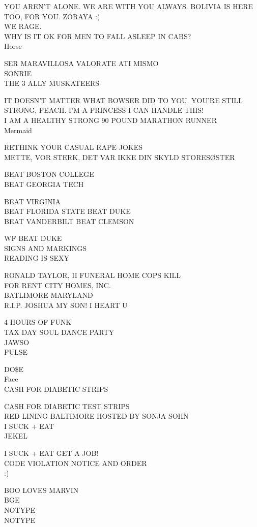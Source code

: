 \documentclass[10pt,letterpaper]{article}
\begin{document}
YOU AREN'T ALONE.  WE ARE WITH YOU ALWAYS.  BOLIVIA IS HERE TOO, FOR YOU.  ZORAYA :)\\
WE RAGE.\\
WHY IS IT OK FOR MEN TO FALL ASLEEP IN CABS?\\
Horse

SER MARAVILLOSA VALORATE ATI MISMO\\
SONRIE\\
THE 3 ALLY MUSKATEERS

IT DOESN'T MATTER WHAT BOWSER DID TO YOU.  YOU'RE STILL STRONG, PEACH.  I'M A PRINCESS I CAN HANDLE THIS!\\
I AM A HEALTHY STRONG 90 POUND MARATHON RUNNER\\
Mermaid

RETHINK YOUR CASUAL RAPE JOKES\\
METTE, VOR STERK, DET VAR IKKE DIN SKYLD STORESØSTER

BEAT BOSTON COLLEGE\\
BEAT GEORGIA TECH

BEAT VIRGINIA\\
BEAT FLORIDA STATE BEAT DUKE\\
BEAT VANDERBILT BEAT CLEMSON

WF BEAT DUKE\\
SIGNS AND MARKINGS\\
READING IS SEXY

RONALD TAYLOR, II FUNERAL HOME COPS KILL\\
FOR RENT CITY HOMES, INC.\\
BATLIMORE MARYLAND\\
R.I.P. JOSHUA MY SON! I HEART U

4 HOURS OF FUNK\\
TAX DAY SOUL DANCE PARTY\\
JAWSO\\
PULSE

DO\$E\\
Face\\
CASH FOR DIABETIC STRIPS

CASH FOR DIABETIC TEST STRIPS\\
RED LINING BALTIMORE HOSTED BY SONJA SOHN\\
I SUCK + EAT\\
JEKEL

I SUCK + EAT GET A JOB!\\
CODE VIOLATION NOTICE AND ORDER\\
:)

BOO LOVES MARVIN\\
BGE\\
NOTYPE\\
NOTYPE
\end{document}
